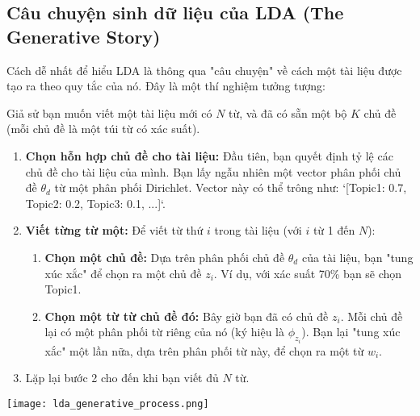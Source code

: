 \subsection{Câu chuyện sinh dữ liệu của LDA (The Generative Story)}
Cách dễ nhất để hiểu LDA là thông qua "câu chuyện" về cách một tài liệu được tạo ra theo quy tắc của nó. Đây là một thí nghiệm tưởng tượng:

\begin{tcolorbox}[
    title=Câu chuyện sinh dữ liệu,
    colback=orange!5!white, colframe=orange!75!black, fonttitle=\bfseries
]
Giả sử bạn muốn viết một tài liệu mới có $N$ từ, và đã có sẵn một bộ $K$ chủ đề (mỗi chủ đề là một túi từ có xác suất).
\begin{enumerate}
    \item \textbf{Chọn hỗn hợp chủ đề cho tài liệu:} Đầu tiên, bạn quyết định tỷ lệ các chủ đề cho tài liệu của mình. Bạn lấy ngẫu nhiên một vector phân phối chủ đề $\theta_d$ từ một phân phối Dirichlet. Vector này có thể trông như: `[Topic1: 0.7, Topic2: 0.2, Topic3: 0.1, ...]`.
    \item \textbf{Viết từng từ một:} Để viết từ thứ $i$ trong tài liệu (với $i$ từ 1 đến $N$):
        \begin{enumerate}
            \item \textbf{Chọn một chủ đề:} Dựa trên phân phối chủ đề $\theta_d$ của tài liệu, bạn "tung xúc xắc" để chọn ra một chủ đề $z_i$. Ví dụ, với xác suất 70\% bạn sẽ chọn Topic1.
            \item \textbf{Chọn một từ từ chủ đề đó:} Bây giờ bạn đã có chủ đề $z_i$. Mỗi chủ đề lại có một phân phối từ riêng của nó (ký hiệu là $\phi_{z_i}$). Bạn lại "tung xúc xắc" một lần nữa, dựa trên phân phối từ này, để chọn ra một từ $w_i$.
        \end{enumerate}
    \item Lặp lại bước 2 cho đến khi bạn viết đủ $N$ từ.
\end{enumerate}
\end{tcolorbox}

\begin{center}
    \texttt{[image: lda\_generative\_process.png]}
    \label{fig:lda_generative_process}
\end{center}

